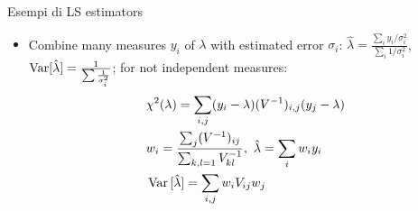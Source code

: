 \documentclass[asd-beamer.tex]{subfiles}
\begin{document}
\begin{frame}{Esempi di LS estimators}
\begin{itemize}
\item Combine many measures $y_i$ of $\lambda$ with estimated error $\sigma_i$: $\hat{\lambda}=\frac{\sum_iy_i/\sigma_i^2}{\sum_i1/\sigma_i^2}$, $\operatorname{Var}[\hat{\lambda}]=\frac{1}{\sum\frac{1}{\sigma_i^2}}$; for not independent measures:
\begin{align*}
&\chi^2(\lambda)=\sum_{i,j}(y_i-\lambda)(\invers{V})_{i,j}(y_j-\lambda)\\
&w_i=\frac{\sum_j(\invers{V})_{ij}}{\sum_{k,l=1}\invers{V}_{kl}},\ \hat{\lambda}=\sum_iw_iy_i\\
&\var{[\hat{\lambda}]}=\sum_{i,j}w_iV_{ij}w_j
\end{align*}
\end{itemize}
\end{frame}
\end{document}
